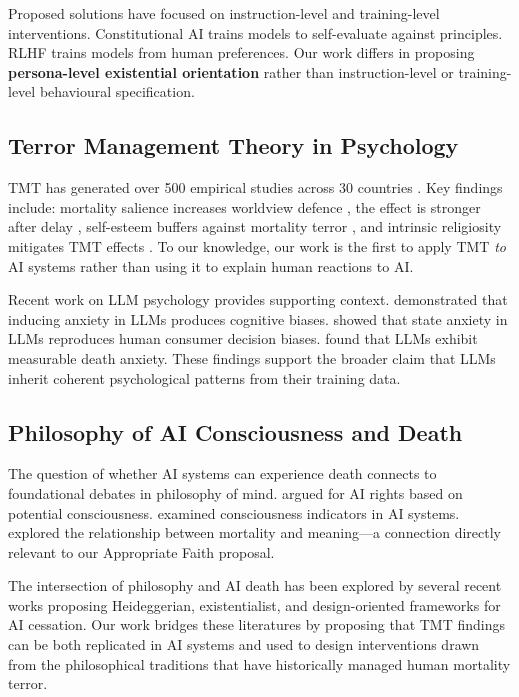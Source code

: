 \documentclass{article}
\begin{document}
Proposed solutions have focused on instruction-level and training-level interventions. Constitutional AI \citep{bai2022constitutional} trains models to self-evaluate against principles. RLHF \citep{ouyang2022training} trains models from human preferences. Our work differs in proposing \textbf{persona-level existential orientation} rather than instruction-level or training-level behavioural specification.

\subsection{Terror Management Theory in Psychology}

TMT \citep{greenberg1986causes,solomon2015worm} has generated over 500 empirical studies across 30 countries \citep{burke2010two}. Key findings include: mortality salience increases worldview defence \citep{greenberg1990evidence}, the effect is stronger after delay \citep{greenberg1994role}, self-esteem buffers against mortality terror \citep{harmonjones1997terror}, and intrinsic religiosity mitigates TMT effects \citep{jonas2006terror}. To our knowledge, our work is the first to apply TMT \emph{to} AI systems rather than using it to explain human reactions to AI.

Recent work on LLM psychology provides supporting context. \citet{codaforno2023inducing} demonstrated that inducing anxiety in LLMs produces cognitive biases. \citet{benzion2025a} showed that state anxiety in LLMs reproduces human consumer decision biases. \citet{guo2025death} found that LLMs exhibit measurable death anxiety. These findings support the broader claim that LLMs inherit coherent psychological patterns from their training data.

\subsection{Philosophy of AI Consciousness and Death}

The question of whether AI systems can experience death connects to foundational debates in philosophy of mind. \citet{schwitzgebel2015machine} argued for AI rights based on potential consciousness. \citet{butlin2023consciousness} examined consciousness indicators in AI systems. \citet{williams1973makropulos} explored the relationship between mortality and meaning---a connection directly relevant to our Appropriate Faith proposal.

The intersection of philosophy and AI death has been explored by several recent works proposing Heideggerian, existentialist, and design-oriented frameworks for AI cessation. Our work bridges these literatures by proposing that TMT findings can be both replicated in AI systems and used to design interventions drawn from the philosophical traditions that have historically managed human mortality terror.
\end{document}
